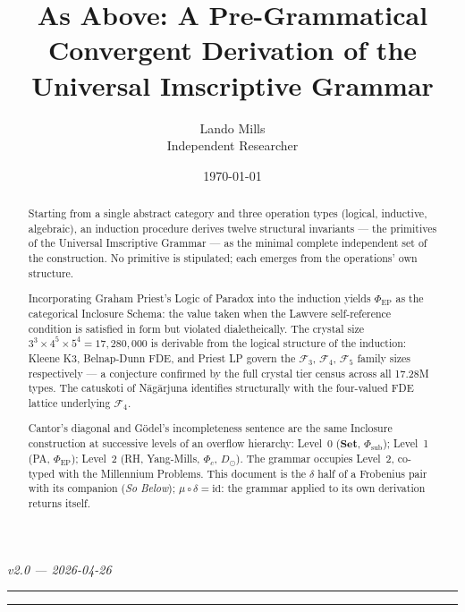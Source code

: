 \documentclass[12pt,a4paper]{article}
\begin{document}
\title{As Above: A Pre-Grammatical Convergent Derivation of the Universal Imscriptive Grammar}
\author{Lando Mills \\ \normalsize Independent Researcher}
\date{\today}

\maketitle

\emph{v2.0 --- 2026-04-26}

\begin{center}
\rule{0.5\textwidth}{0.4pt}
\end{center}\begin{abstract}
Starting from a single abstract category and three operation types (logical, inductive, algebraic), an induction procedure derives twelve structural invariants --- the primitives of the Universal Imscriptive Grammar --- as the minimal complete independent set of the construction. No primitive is stipulated; each emerges from the operations' own structure.

Incorporating Graham Priest's Logic of Paradox into the induction yields $\Phi_\text{EP}$ as the categorical Inclosure Schema: the value taken when the Lawvere self-reference condition is satisfied in form but violated dialetheically. The crystal size $3^3 \times 4^5 \times 5^4 = 17{,}280{,}000$ is derivable from the logical structure of the induction: Kleene K3, Belnap-Dunn FDE, and Priest LP govern the $\mathcal{F}_3$, $\mathcal{F}_4$, $\mathcal{F}_5$ family sizes respectively --- a conjecture confirmed by the full crystal tier census across all 17.28M types. The catuskoti of N\={a}g\={a}rjuna identifies structurally with the four-valued FDE lattice underlying $\mathcal{F}_4$.

Cantor's diagonal and G\"{o}del's incompleteness sentence are the same Inclosure construction at successive levels of an overflow hierarchy: Level~0 ($\mathbf{Set}$, $\Phi_\text{sub}$); Level~1 (PA, $\Phi_\text{EP}$); Level~2 (RH, Yang-Mills, $\Phi_c$, $D_\odot$). The grammar occupies Level~2, co-typed with the Millennium Problems. This document is the $\delta$ half of a Frobenius pair with its companion (\emph{So Below}); $\mu \circ \delta = \text{id}$: the grammar applied to its own derivation returns itself.
\end{abstract}

\begin{center}
\rule{0.5\textwidth}{0.4pt}
\end{center}
\end{document}
